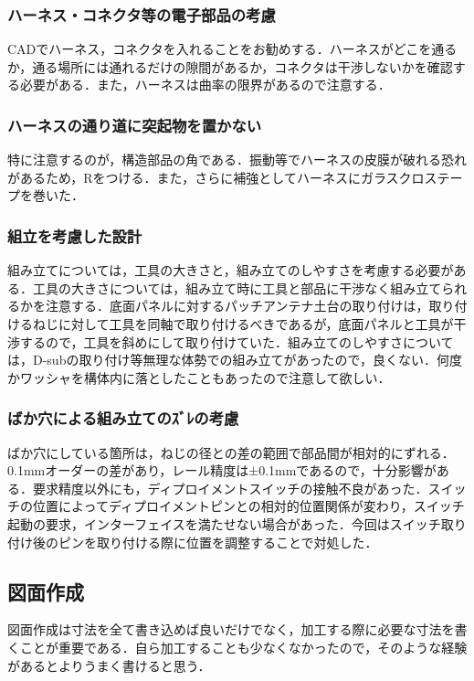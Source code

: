 \subsubsection{ハーネス・コネクタ等の電子部品の考慮}
CADでハーネス，コネクタを入れることをお勧めする．ハーネスがどこを通るか，通る場所には通れるだけの隙間があるか，コネクタは干渉しないかを確認する必要がある．また，ハーネスは曲率の限界があるので注意する．
\subsubsection{ハーネスの通り道に突起物を置かない}
特に注意するのが，構造部品の角である．振動等でハーネスの皮膜が破れる恐れがあるため，Rをつける．また，さらに補強としてハーネスにガラスクロステープを巻いた．
\subsubsection{組立を考慮した設計}
組み立てについては，工具の大きさと，組み立てのしやすさを考慮する必要がある．工具の大きさについては，組み立て時に工具と部品に干渉なく組み立てられるかを注意する．底面パネルに対するパッチアンテナ土台の取り付けは，取り付けるねじに対して工具を同軸で取り付けるべきであるが，底面パネルと工具が干渉するので，工具を斜めにして取り付けていた．組み立てのしやすさについては，D-subの取り付け等無理な体勢での組み立てがあったので，良くない．何度かワッシャを構体内に落としたこともあったので注意して欲しい．
\subsubsection{ばか穴による組み立てのｽﾞﾚの考慮}
ばか穴にしている箇所は，ねじの径との差の範囲で部品間が相対的にずれる．0.1mmオーダーの差があり，レール精度は±0.1mmであるので，十分影響がある．要求精度以外にも，ディプロイメントスイッチの接触不良があった．スイッチの位置によってディプロイメントピンとの相対的位置関係が変わり，スイッチ起動の要求，インターフェイスを満たせない場合があった．今回はスイッチ取り付け後のピンを取り付ける際に位置を調整することで対処した．


\subsection{図面作成}
図面作成は寸法を全て書き込めば良いだけでなく，加工する際に必要な寸法を書くことが重要である．自ら加工することも少なくなかったので，そのような経験があるとよりうまく書けると思う．

